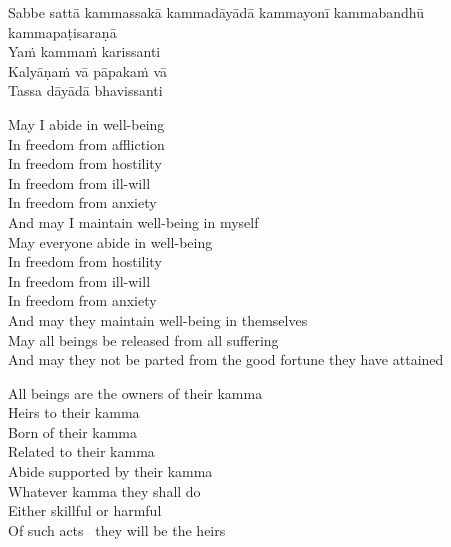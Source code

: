 Sabbe sattā kammassakā kammadāyādā kammayonī kammabandhū kammapaṭisaraṇā\\
Yaṁ kammaṁ karissanti\\
Kalyāṇaṁ vā pāpakaṁ vā\\
Tassa dāyādā bhavissanti

\begin{leader}
\end{leader}

\begin{english}
  May I abide in well-being\\
  In freedom from affliction\\
  In freedom from hostility\\
  In freedom from ill-will\\
  In freedom from anxiety\\
  And may I maintain well-being in myself\\
  May everyone abide in well-being\\
  In freedom from hostility\\
  In freedom from ill-will\\
  In freedom from anxiety\\
  And may they maintain well-being in themselves\\
  May all beings be released from all suffering\\
  And may they not be parted from the good fortune they have attained

  All beings are the owners of their kamma\\
  Heirs to their kamma\\
  Born of their kamma\\
  Related to their kamma\\
  Abide supported by their kamma\\
  Whatever kamma they shall do\\
  Either skillful or harmful\\
  Of such acts \breathmark\ they will be the heirs\\
\end{english}

